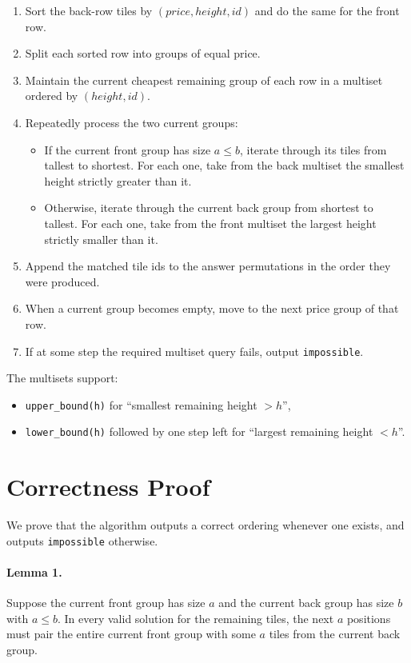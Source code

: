 \documentclass[11pt]{article}
\begin{document}
\begin{enumerate}[leftmargin=*]
    \item Sort the back-row tiles by $(price, height, id)$ and do the same for the front row.
    \item Split each sorted row into groups of equal price.
    \item Maintain the current cheapest remaining group of each row in a multiset ordered by $(height, id)$.
    \item Repeatedly process the two current groups:
    \begin{itemize}[leftmargin=*]
        \item If the current front group has size $a \le b$, iterate through its tiles from tallest to shortest. For each one, take from the back multiset the smallest height strictly greater than it.
        \item Otherwise, iterate through the current back group from shortest to tallest. For each one, take from the front multiset the largest height strictly smaller than it.
    \end{itemize}
    \item Append the matched tile ids to the answer permutations in the order they were produced.
    \item When a current group becomes empty, move to the next price group of that row.
    \item If at some step the required multiset query fails, output \texttt{impossible}.
\end{enumerate}

The multisets support:
\begin{itemize}[leftmargin=*]
    \item \texttt{upper\_bound(h)} for ``smallest remaining height $> h$'',
    \item \texttt{lower\_bound(h)} followed by one step left for ``largest remaining height $< h$''.
\end{itemize}

\section*{Correctness Proof}

We prove that the algorithm outputs a correct ordering whenever one exists, and outputs \texttt{impossible} otherwise.

\paragraph{Lemma 1.}
Suppose the current front group has size $a$ and the current back group has size $b$ with $a \le b$. In every valid solution for the remaining tiles, the next $a$ positions must pair the entire current front group with some $a$ tiles from the current back group.
\end{document}
